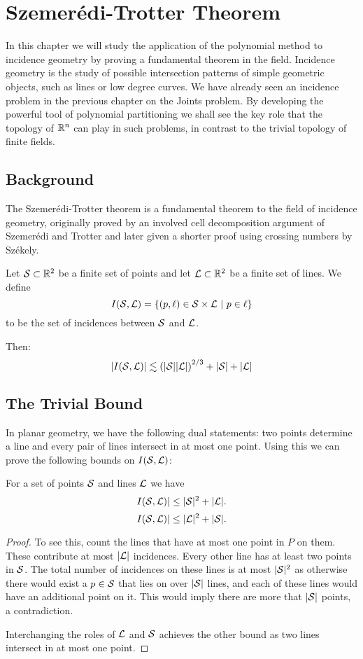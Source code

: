 \chapter{Szemerédi-Trotter Theorem \label{chap:trotter}}

In this chapter we will study the application of the polynomial method to incidence geometry by proving a fundamental theorem in the field.
Incidence geometry is the study of possible intersection patterns of simple geometric objects, such as lines or low degree curves. 
We have already seen an incidence problem in the previous chapter on the Joints problem. 
By developing the powerful tool of polynomial partitioning we shall see the key role that the topology of $\mathbb R^n$ can play in such problems, 
in contrast to the trivial topology of finite fields. 


\section{Background}
The Szemerédi-Trotter theorem is a fundamental theorem to the field of incidence geometry, originally proved by an involved cell decomposition argument
of Szemerédi and Trotter and later given a shorter proof using crossing numbers by Székely. 
\begin{theorem}
    Let $\mathcal S \subset\mathbb R^2$ be a finite set of points and
    let $\mathcal L \subset \mathbb R^2$ be a finite set of lines. We define 
    \[I(\ES,\LL) = \{(p, \ell) \in \ES \times \LL \ | \ p \in \ell\}\] 
    to be the set of incidences between $\mathcal S$ and $\mathcal L$. 
   
    Then:
    \[
        |I(\mathcal S, \mathcal L)| \lesssim \left(|\mathcal S||\mathcal L|\right)^{2/3} + |\mathcal S| + |\mathcal L|
    \]
    \label{thm:S-T}
\end{theorem}

\section{The Trivial Bound}
In planar geometry, we have the following dual statements: two points determine a line and every pair of lines intersect in at most one point.
Using this we can prove the following bounds on $I(\mathcal S,\mathcal L)$:
\begin{theorem}
    For a set of points $\mathcal S$ and lines $\mathcal L$ we have
    \[I(\mathcal S,\mathcal L)| \leq |\mathcal S|^2 + |\mathcal L|. \]
    \[I(\mathcal S,\mathcal L)| \leq |\mathcal L|^2 + |\mathcal S|. \]
    \label{thm:trivial-ST-bounds}
\end{theorem}
\begin{proof}

To see this, count the lines that have at most one point in $P$ on them. These contribute at most $|\mathcal L|$ incidences.
Every other line has at least two points in $\mathcal S$. The total number of incidences on these lines is at most $|\mathcal S|^2$
as otherwise there would exist a $p\in \mathcal S$ that lies on over $|\mathcal S|$ lines, and each of these lines would have an additional 
point on it. This would imply there are more that $|\mathcal S|$ points, a contradiction. 

Interchanging the roles of $\mathcal L$ and $\mathcal S$ achieves the other bound as two lines intersect in at most one point.
\end{proof}

